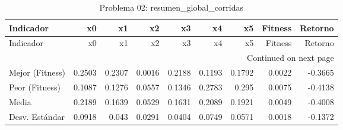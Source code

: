 \begin{longtable}{lrrrrrrrr}
\caption{Problema 02: resumen\_global\_corridas}\label{tab:resumen_global_corridas} \\
\toprule
Indicador & x0 & x1 & x2 & x3 & x4 & x5 & Fitness & Retorno\\
\midrule
\endfirsthead
\toprule
Indicador & x0 & x1 & x2 & x3 & x4 & x5 & Fitness & Retorno\\
\midrule
\endhead
\midrule
\multicolumn{9}{r}{Continued on next page} \\
\midrule
\endfoot
\bottomrule
\endlastfoot
Mejor (Fitness) & 0.2503 & 0.2307 & 0.0016 & 0.2188 & 0.1193 & 0.1792 & 0.0022 & -0.3665\\
Peor (Fitness) & 0.1087 & 0.1276 & 0.0557 & 0.1346 & 0.2783 & 0.295 & 0.0075 & -0.4138\\
Media & 0.2189 & 0.1639 & 0.0529 & 0.1631 & 0.2089 & 0.1921 & 0.0049 & 	-0.4008\\
Desv. Estándar & 0.0918 & 0.043 & 0.0291 & 0.0404 & 0.0749 & 0.0571 & 0.0018 & 	-0.1372\\
\end{longtable}